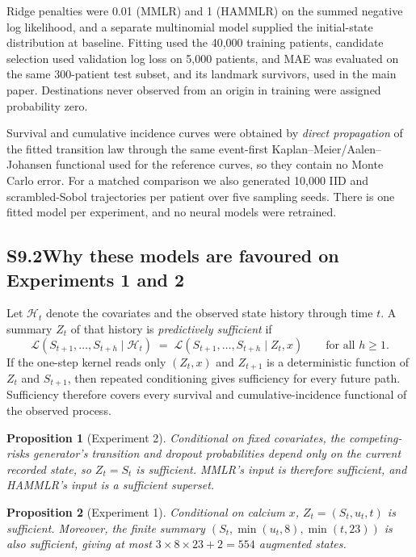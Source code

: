 \documentclass[11pt]{article}
\newtheorem{proposition}{Proposition}
\newcommand{\Law}{\mathcal{L}}
\begin{document}
Ridge penalties were 0.01 (MMLR) and 1 (HAMMLR) on the summed negative log likelihood, and a separate multinomial model supplied the initial-state distribution at baseline. Fitting used the 40{,}000 training patients, candidate selection used validation log loss on 5{,}000 patients, and MAE was evaluated on the same 300-patient test subset, and its landmark survivors, used in the main paper. Destinations never observed from an origin in training were assigned probability zero.

Survival and cumulative incidence curves were obtained by \emph{direct propagation} of the fitted transition law through the same event-first Kaplan--Meier/Aalen--Johansen functional used for the reference curves, so they contain no Monte Carlo error. For a matched comparison we also generated 10{,}000 IID and scrambled-Sobol trajectories per patient over five sampling seeds. There is one fitted model per experiment, and no neural models were retrained.

\subsection*{S9.2\quad Why these models are favoured on Experiments 1 and 2}

Let $\mathcal H_t$ denote the covariates and the observed state history through time $t$. A summary $Z_t$ of that history is \emph{predictively sufficient} if
\begin{equation}
\Law(S_{t+1},\dots,S_{t+h}\mid \mathcal H_t) \;=\; \Law(S_{t+1},\dots,S_{t+h}\mid Z_t, x)\qquad\text{for all } h\ge 1 .
\end{equation}
If the one-step kernel reads only $(Z_t,x)$ and $Z_{t+1}$ is a deterministic function of $Z_t$ and $S_{t+1}$, then repeated conditioning gives sufficiency for every future path. Sufficiency therefore covers every survival and cumulative-incidence functional of the observed process.

\begin{proposition}[Experiment 2]
Conditional on fixed covariates, the competing-risks generator's transition and dropout probabilities depend only on the current recorded state, so $Z_t=S_t$ is sufficient. MMLR's input is therefore sufficient, and HAMMLR's input is a sufficient superset.
\end{proposition}

\begin{proposition}[Experiment 1]
Conditional on calcium $x$, $Z_t=(S_t,u_t,t)$ is sufficient. Moreover, the finite summary $(S_t,\min(u_t,8),\min(t,23))$ is also sufficient, giving at most $3\times 8\times 23+2=554$ augmented states.
\end{proposition}
\end{document}
